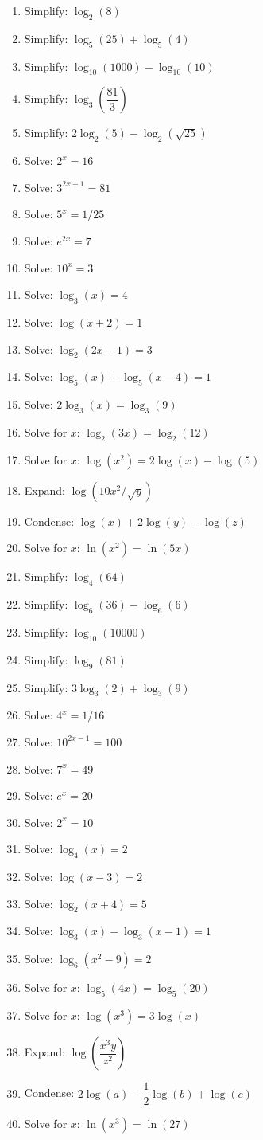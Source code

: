 \documentclass[12pt]{article}
\begin{document}
\begin{enumerate}
  \item Simplify: $\log_2(8)$
  \item Simplify: $\log_5(25) + \log_5(4)$
  \item Simplify: $\log_{10}(1000) - \log_{10}(10)$
  \item Simplify: $\log_3(\dfrac{81}{3})$
  \item Simplify: $2\log_2(5) - \log_2(\sqrt{25})$
  \item Solve: $2^x = 16$
  \item Solve: $3^{2x+1} = 81$
  \item Solve: $5^x = 1/25$
  \item Solve: $e^{2x} = 7$
  \item Solve: $10^x = 3$
  \item Solve: $\log_3(x) = 4$
  \item Solve: $\log(x+2) = 1$
  \item Solve: $\log_2(2x - 1) = 3$
  \item Solve: $\log_5(x) + \log_5(x-4) = 1$
  \item Solve: $2\log_3(x) = \log_3(9)$
  \item Solve for $x$: $\log_2(3x) = \log_2(12)$
  \item Solve for $x$: $\log(x^2) = 2\log(x) - \log(5)$
  \item Expand: $\log(10x^2/\sqrt{y})$
  \item Condense: $\log(x) + 2\log(y) - \log(z)$
  \item Solve for $x$: $\ln(x^2) = \ln(5x)$

  \item Simplify: $\log_4(64)$
  \item Simplify: $\log_6(36) - \log_6(6)$
  \item Simplify: $\log_{10}(10000)$
  \item Simplify: $\log_9(81)$
  \item Simplify: $3\log_3(2) + \log_3(9)$
  \item Solve: $4^x = 1/16$
  \item Solve: $10^{2x-1} = 100$
  \item Solve: $7^x = 49$
  \item Solve: $e^x = 20$
  \item Solve: $2^x = 10$
  \item Solve: $\log_4(x) = 2$
  \item Solve: $\log(x-3) = 2$
  \item Solve: $\log_2(x+4) = 5$
  \item Solve: $\log_3(x) - \log_3(x-1) = 1$
  \item Solve: $\log_6(x^2 - 9) = 2$
  \item Solve for $x$: $\log_5(4x) = \log_5(20)$
  \item Solve for $x$: $\log(x^3) = 3\log(x)$
  \item Expand: $\log(\dfrac{x^3 y}{z^2})$
  \item Condense: $2\log(a) - \dfrac{1}{2}\log(b) + \log(c)$
  \item Solve for $x$: $\ln(x^3) = \ln(27)$
\end{enumerate}
\end{document}
